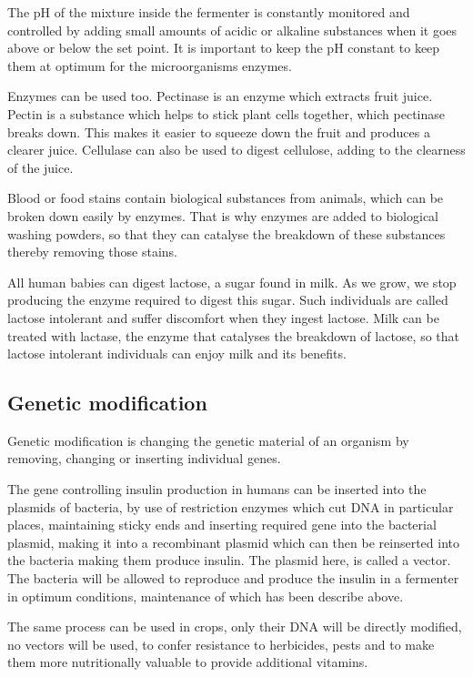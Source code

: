 The pH of the mixture inside the fermenter is constantly monitored and controlled by adding small
amounts of acidic or alkaline substances when it goes above or below the set point. It is important
to keep the pH constant to keep them at optimum for the microorganisms enzymes.

Enzymes can be used too. Pectinase is an enzyme which extracts fruit juice. Pectin is a substance
which helps to stick plant cells together, which pectinase breaks down. This makes it easier
to squeeze down the fruit and produces a clearer juice. Cellulase can also be used to digest
cellulose, adding to the clearness of the juice.

Blood or food stains contain biological substances from animals, which can be broken down easily
by enzymes. That is why enzymes are added to biological washing powders, so that they can catalyse
the breakdown of these substances thereby removing those stains.

All human babies can digest lactose, a sugar found in milk. As we grow, we stop producing the
enzyme required to digest this sugar. Such individuals are called lactose intolerant and suffer
discomfort when they ingest lactose. Milk can be treated with lactase, the enzyme that catalyses
the breakdown of lactose, so that lactose intolerant individuals can enjoy milk and its benefits.

\subsection{Genetic modification}

Genetic modification is changing the genetic material of an organism by removing, changing or 
inserting individual genes.

The gene controlling insulin production in humans can be inserted into the plasmids of bacteria,
by use of restriction enzymes which cut DNA in particular places, maintaining sticky ends and 
inserting required gene into the bacterial plasmid, making it into a recombinant plasmid which can
then be reinserted into the bacteria making them produce insulin. The plasmid here, is called a
vector. The bacteria will be allowed to reproduce and produce the insulin in a fermenter in optimum
conditions, maintenance of which has been describe above.

The same process can be used in crops, only their DNA will be directly modified, no vectors will
be used, to confer resistance to herbicides, pests and to make them more nutritionally valuable
to provide additional vitamins.

